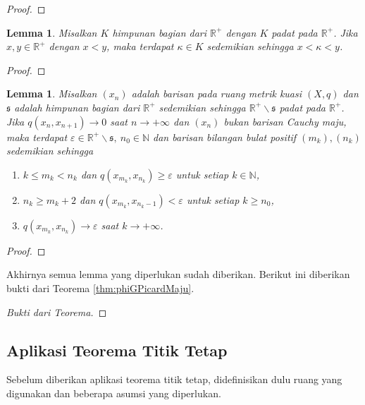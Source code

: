 \documentclass[journal]{IEEEtran}
\newtheorem{lemmas}[defn]{Lemma}
\theoremstyle{definition}
\theoremstyle{definition}
\theoremstyle{plain}
\newcommand{\R}{\mathbb{R}}
\renewcommand{\natural}{\mathbb{N}}
\begin{document}
\begin{proof}

\end{proof}
\begin{lemmas}\label{lemma:padatR}
    Misalkan $K$ himpunan bagian dari $\R^+$ dengan $K$ padat pada $\R^+$. Jika $x,y\in\R^+$ dengan $x<y$, maka terdapat $\kappa\in K$ sedemikian sehingga $x<\kappa<y$.
\end{lemmas}
\begin{proof}
\end{proof}
\begin{lemmas}\label{3prop}
\cite{Secelean2019} Misalkan $(x_n)$ adalah barisan pada ruang metrik kuasi $(X,q)$ dan $\mathfrak{s}$ adalah himpunan bagian dari $\R^+$ sedemikian sehingga $\R^+\backslash \mathfrak{s}$ padat pada $\R^+$. Jika $q(x_n,x_{n+1})\rightarrow 0$ saat $n\rightarrow+\infty$ dan $(x_n)$ bukan barisan Cauchy maju, maka terdapat $\varepsilon\in \R^+\backslash\mathfrak{s},~n_0\in \natural$ dan barisan bilangan bulat positif $(m_k), (n_k)$ sedemikian sehingga 
\begin{enumerate}
    \item[(a)] $k\leq m_k<n_k$ dan $q(x_{m_k},x_{n_k})\geq \varepsilon$ untuk setiap $k\in\natural$,
    \item[(b)] $n_k\geq m_k+2$ dan $q(x_{m_k},x_{n_k-1})<\varepsilon$ untuk setiap $k\geq n_0$,
    \item[(c)] $q(x_{m_k},x_{n_k})\rightarrow\varepsilon$ saat $k\rightarrow+\infty$.
\end{enumerate}
\end{lemmas}

\begin{proof}

\end{proof}

Akhirnya semua lemma yang diperlukan sudah diberikan. Berikut ini diberikan bukti dari Teorema \ref{thm:phiGPicardMaju}.

\begin{proof}[Bukti dari Teorema]
\end{proof}
\subsection{Aplikasi Teorema Titik Tetap}
Sebelum diberikan aplikasi teorema titik tetap, didefinisikan dulu ruang yang digunakan dan beberapa asumsi yang diperlukan.\\
\end{document}
